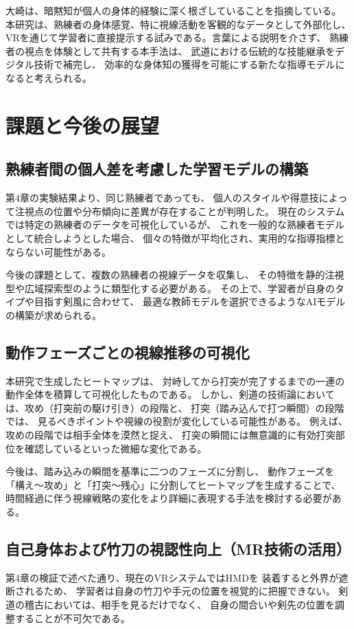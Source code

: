 \documentclass[dvipdfmx]{ujreport}
\begin{document}
    大崎は、暗黙知が個人の身体的経験に深く根ざしていることを指摘している。
    本研究は、熟練者の身体感覚、特に視線活動を客観的なデータとして外部化し、
    VRを通じて学習者に直接提示する試みである。言葉による説明を介さず、
    熟練者の視点を体験として共有する本手法は、
    武道における伝統的な技能継承をデジタル技術で補完し、
    効率的な身体知の獲得を可能にする新たな指導モデルになると考えられる。
    
    \section{課題と今後の展望}
    \subsection{熟練者間の個人差を考慮した学習モデルの構築}
    第4章の実験結果より、同じ熟練者であっても、
    個人のスタイルや得意技によって注視点の位置や分布傾向に差異が存在することが判明した。
    現在のシステムでは特定の熟練者のデータを可視化しているが、
    これを一般的な熟練者モデルとして統合しようとした場合、
    個々の特徴が平均化され、実用的な指導指標とならない可能性がある。
    
    今後の課題として、複数の熟練者の視線データを収集し、
    その特徴を静的注視型や広域探索型のように類型化する必要がある。
    その上で、学習者が自身のタイプや目指す剣風に合わせて、
    最適な教師モデルを選択できるようなAIモデルの構築が求められる。

    \subsection{動作フェーズごとの視線推移の可視化}
    本研究で生成したヒートマップは、
    対峙してから打突が完了するまでの一連の動作全体を積算して可視化したものである。
    しかし、剣道の技術論においては、攻め（打突前の駆け引き）の段階と、
    打突（踏み込んで打つ瞬間）の段階では、
    見るべきポイントや視線の役割が変化している可能性がある。
    例えば、攻めの段階では相手全体を漠然と捉え、
    打突の瞬間には無意識的に有効打突部位を確認しているといった微細な変化である。
    
    今後は、踏み込みの瞬間を基準に二つのフェーズに分割し、
    動作フェーズを「構え〜攻め」と「打突〜残心」に分割してヒートマップを生成することで、
    時間経過に伴う視線戦略の変化をより詳細に表現する手法を検討する必要がある。

    \subsection{自己身体および竹刀の視認性向上（MR技術の活用）}
    第4章の検証で述べた通り、現在のVRシステムではHMDを
    装着すると外界が遮断されるため、
    学習者は自身の竹刀や手元の位置を視覚的に把握できない。
    剣道の稽古においては、相手を見るだけでなく、
    自身の間合いや剣先の位置を調整することが不可欠である。
\end{document}
